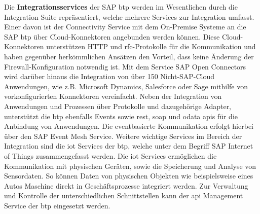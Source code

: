 Die \textbf{Integrationsservices} der SAP \ac{btp} werden im Wesentlichen durch die Integration Suite repräsentiert, welche mehrere Services zur Integration umfasst. Einer davon ist der Connectivity Service mit dem On-Premise Systeme an die SAP \ac{btp} über Cloud-Konnektoren angebunden werden können. \autocite[Vgl.][]{CLOUDCONNECTOR} Diese Cloud-Konnektoren unterstützen HTTP und \ac{rfc}-Protokolle für die Kommunikation und haben gegenüber herkömmlichen Ansätzen den Vorteil, dass keine Änderung der Firewall-Konfiguration notwendig ist. Mit dem Service SAP Open Connectors wird darüber hinaus die Integration von über 150 Nicht-SAP-Cloud Anwendungen, wie z.B. Microsoft Dynamics, Salesforce oder Sage mithilfe von vorkonfigurierten Konnektoren vereinfacht. \autocite[Vgl.][S. 28]{INTEGRATIONSUITE2023} Neben der Integration von Anwendungen und Prozessen über Protokolle und dazugehörige Adapter, unterstützt die \ac{btp} ebenfalls Events sowie \ac{rest}, \ac{soap} und \ac{odata} \ac{api}s für die Anbindung von Anwendungen. \autocite[Vgl.][]{BTPAPIS2023} Die eventbasierte Kommunikation erfolgt hierbei über den SAP Event Mesh Service.  \autocite[Vgl.][S. 4]{EVENTMESH2022} Weitere wichtige Services im Bereich der Integration sind die \ac{iot} Services der \ac{btp}, welche unter dem Begriff SAP Internet of Things zusammengefasst werden. \autocite[Vgl.][S. 163]{SEUBERT} Die \ac{iot} Services ermöglichen die Kommunikation mit physischen Geräten, sowie die Speicherung und Analyse von Sensordaten. So können Daten von physischen Objekten wie beispielsweise eines Autos Maschine direkt in Geschäftsprozesse integriert werden. \autocite[Vgl.][]{IOTBTP2023}  Zur Verwaltung und Kontrolle der unterschiedlichen Schnittstellen kann der \ac{api} Management Service der \ac{btp} eingesetzt werden. \autocite[Vgl.][S. 72]{SEUBERT} 

